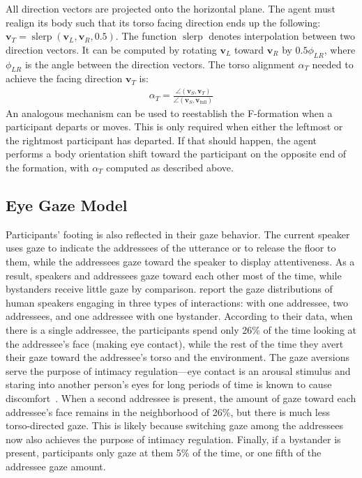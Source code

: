 All direction vectors are projected onto the horizontal plane. The agent must realign its body such that its torso facing direction ends up the following: $\mathbf{v}_T = \mathop{slerp}(\mathbf{v}_L, \mathbf{v}_R, 0.5)$. The function $\mathop{slerp}$ denotes interpolation between two direction vectors. It can be computed by rotating $\mathbf{v}_L$ toward $\mathbf{v}_R$ by $0.5 \phi_{LR}$, where $\phi_{LR}$ is the angle between the direction vectors. The torso alignment $\alpha_T$ needed to achieve the facing direction $\mathbf{v}_T$ is:
%
\begin{align} \label{eq:FTorsoAlign}
\alpha_T = \frac{\angle(\mathbf{v}_S, \mathbf{v}_T)}{\angle(\mathbf{v}_S, \mathbf{v}_\mathrm{full})}
\end{align}
%
An analogous mechanism can be used to reestablish the F-formation when a participant departs or moves. This is only required when either the leftmost or the rightmost participant has departed. If that should happen, the agent performs a body orientation shift toward the participant on the opposite end of the formation, with $\alpha_T$ computed as described above.

\subsection{Eye Gaze Model}

Participants' footing is also reflected in their gaze behavior. The current speaker uses gaze to indicate the addressees of the utterance or to release the floor to them, while the addressees gaze toward the speaker to display attentiveness. As a result, speakers and addressees gaze toward each other most of the time, while bystanders receive little gaze by comparison. \citet{mutlu2012conversational} report the gaze distributions of human speakers engaging in three types of interactions: with one addressee, two addressees, and one addressee with one bystander. According to their data, when there is a single addressee, the participants spend only 26\% of the time looking at the addressee's face (making eye contact), while the rest of the time they avert their gaze toward the addressee's torso and the environment. The gaze aversions serve the purpose of intimacy regulation---eye contact is an arousal stimulus and staring into another person's eyes for long periods of time is known to cause discomfort~\citep{argyle1976gaze}. When a second addressee is present, the amount of gaze toward each addressee's face remains in the neighborhood of 26\%, but there is much less torso-directed gaze. This is likely because switching gaze among the addressees now also achieves the purpose of intimacy regulation. Finally, if a bystander is present, participants only gaze at them 5\% of the time, or one fifth of the addressee gaze amount.

